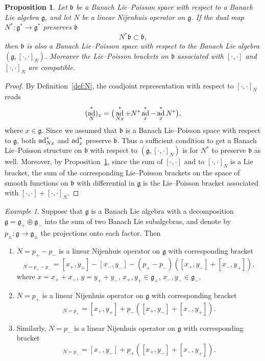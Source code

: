 \documentclass[a4paper,12pt,reqno]{amsart}%
\newtheorem{proposition}[theorem]{Proposition}
\theoremstyle{definition}
\theoremstyle{remark}
\newtheorem{example}[theorem]{Example}
\numberwithin{theorem}{section}
\numberwithin{equation}{section}
\newcommand{\1}{{\bf 1}}
\DeclareMathOperator{\ad}{\textnormal{ad}}
\newcommand{\g}{{\mathfrak g}}
\newcommand{\bg}{{\mathfrak b}}
\begin{document}
\begin{proposition}\label{GNcompatible}
Let $\bg$ be a Banach Lie--Poisson space with respect to a Banach Lie algebra $\g$, and let $N$ be a linear Nijenhuis operator on $\g$. If the dual map $N^*:\g^*\to\g^*$ preserves $\bg$
\[ N^*\bg\subset \bg,\] 
then $\bg$ is also a Banach Lie--Poisson space with respect to the Banach Lie algebra $(\g, [\cdot, \cdot]_N)$. Moreover the Lie--Poisson brackets on $\bg$ associated with $[\cdot, \cdot]$ and  $[\cdot, \cdot]_N$ are compatible.
\end{proposition}


\begin{proof}
  By Definition~\eqref{def:N}, the coadjoint representation with respect to $[\cdot, \cdot]_N$ reads
    \begin{equation}\label{coad_N}
    (\ad_N^*)_x = \big(\ad^*_{Nx} + N^*\ad^*_x - \ad^*_x N^*\big),
    \end{equation}
    where $x\in\g$. Since we assumed that $\bg$ is a Banach Lie--Poisson space with respect to $\g$, both $\ad^*_{Nx}$ and $\ad^*_x$ preserve $\bg$. Thus a sufficient condition to get a Banach Lie--Poisson structure on $\bg$ with respect to $\left(\g, [\cdot, \cdot]_N\right)$ is for $N^*$ to preserve $\bg$ as well. Moreover, by Proposition~\ref{GNcompatible}, since the sum of $[\cdot, \cdot]$ and to $[\cdot, \cdot]_N$ is a Lie bracket, the sum of the corresponding Lie--Poisson brackets on the space of smooth functions on $\bg$ with differential in $\g$ is the Lie--Poisson bracket associated with $[\cdot, \cdot]+[\cdot, \cdot]_N$.
\end{proof}
\begin{example}
    Suppose that $\g$ is a Banach Lie algebra with a decomposition $\g = \g_+ \oplus \g_-$ into the sum of two Banach Lie subalgebras, and denote by $p_\pm: \g \rightarrow \g_\pm$ the projections onto each factor. Then
    \begin{enumerate}
        \item $N = p_+ - p_-$ is a linear Nijenhuis operator on $\g$ with corresponding bracket
        \begin{equation}
            [x, y]_{N = p_+ - p_-} = [x_+, y_+] - [x_-, y_-] - (p_+-p_-)\left([x_+, y_-] + [x_-, y_+]\right),
        \end{equation}
        where $x = x_+ + x_-$, $y = y_+ + y_-$, $x_+, y_+\in \g_+$, $x_-, y_-\in \g_-$.
        \item $N = p_+$ is a linear Nijenhuis operator on $\g$ with corresponding bracket
        \begin{equation}
            [x, y]_{N = p_+} = [x_+, y_+] + p_-\left([x_+, y_-]+[x_-, y_+]\right).
        \end{equation}
        \item Similarly, $N= p_-$ is a linear Nijenhuis operator on $\g$ with corresponding bracket
        \begin{equation}
            [x, y]_{N = p_-} = [x_-, y_-] + p_+\left([x_+, y_-]+[x_-, y_+]\right).
        \end{equation}
    \end{enumerate}
\end{example}
\end{document}
